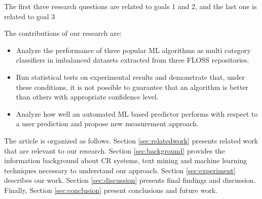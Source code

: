 The first three research questions are related to goals 1 and 2, and the last one is related to goal 3

The contributions of our research are:
\begin{itemize}
  \item Analyze the performance of three popular ML algorithms as multi category classifiers in imbalanced datasets extracted from three FLOSS repositories. 
  \item Run statistical tests on experimental results and demonstrate that, under these conditions, it is not possible to guarantee that an algorithm is better than others with appropriate confidence level.
  \item Analyze how well an automated ML based predictor performs with respect to a user prediction and propose new measurement approach.
\end{itemize}

The article is organized as follows. Section \ref{sec:relatedwork} presents related work that are relevant to our research. Section \ref{sec:background} provides the information background about CR systems, text mining and machine learning techniques necessary to understand our approach. Section \ref{sec:experiment} describes our work. Section \ref{sec:discussion} presents final findings and discussion. Finally, Section \ref{sec:conclusion} present  conclusions and  future work.

